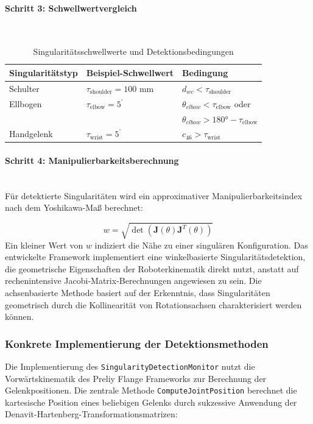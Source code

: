 \paragraph{Schritt 3: Schwellwertvergleich}~\\
\begin{table}[H]
	\centering
	\begin{tabular}{l l l}
		\hline
		\textbf{Singularitätstyp} & \textbf{Beispiel-Schwellwert}      & \textbf{Bedingung}                            \\
		\hline
		Schulter                  & $\tau_{\text{shoulder}} = 100$ mm  & $d_{wc} < \tau_{\text{shoulder}}$             \\
		Ellbogen                  & $\tau_{\text{elbow}} = 5^{^\circ}$ & $\theta_{elbow} < \tau_{\text{elbow}}$ oder   \\
		                          &                                    & $\theta_{elbow} > 180° - \tau_{\text{elbow}}$ \\
		Handgelenk                & $\tau_{\text{wrist}} = 5^{^\circ}$ & $c_{46} > \tau_{\text{wrist}}$                \\
		\hline
	\end{tabular}
	\caption{Singularitätsschwellwerte und Detektionsbedingungen}
	\label{tab:singularity_thresholds}
\end{table}

\paragraph{Schritt 4: Manipulierbarkeitsberechnung}~\\
Für detektierte Singularitäten wird ein approximativer Manipulierbarkeitsindex
nach dem Yoshikawa-Maß berechnet:

\begin{equation}
	w = \sqrt{\det(\mathbf{J}(\theta)\mathbf{J}^T(\theta))}
	\label{eq:manipulability}
\end{equation}
\noindent
Ein kleiner Wert von $w$ indiziert die Nähe zu einer singulären Konfiguration.
Das entwickelte Framework implementiert eine winkelbasierte
Singularitätsdetektion, die geometrische Eigenschaften der Roboterkinematik
direkt nutzt, anstatt auf rechenintensive Jacobi-Matrix-Berechnungen angewiesen
zu sein. Die achsenbasierte Methode basiert auf der Erkenntnis, dass
Singularitäten geometrisch durch die Kollinearität von Rotationsachsen
charakterisiert werden können.

\subsubsection{Konkrete Implementierung der Detektionsmethoden}
\label{sssec:Implementierung_Detektionsmethoden}
Die Implementierung des \texttt{SingularityDetectionMonitor} nutzt die
Vorwärtskinematik des Preliy Flange Frameworks zur Berechnung der
Gelenkpositionen. Die zentrale Methode \texttt{ComputeJointPosition} berechnet
die kartesische Position eines beliebigen Gelenks durch sukzessive Anwendung
der Denavit-Hartenberg-Transformationsmatrizen:


